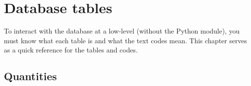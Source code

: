 %

\chapter{Database tables}

To interact with the database at a low-level (without the Python module), you
must know what each table is and what the text codes mean.  This chapter serves
as a quick reference for the tables and codes.


\section{Quantities}


